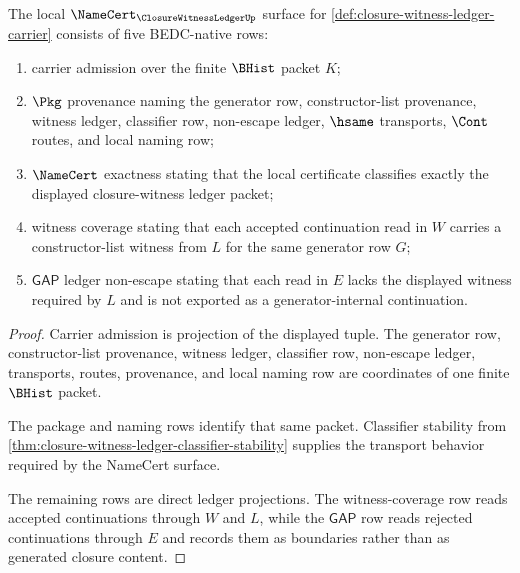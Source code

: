 \begin{theorem}
\label{thm:closure-witness-ledger-namecert-obligations}
The local $\NameCert_{\ClosureWitnessLedgerUp}$ surface for \autoref{def:closure-witness-ledger-carrier} consists of five BEDC-native rows:
\begin{enumerate}
\item carrier admission over the finite $\BHist$ packet $K$;
\item $\Pkg$ provenance naming the generator row, constructor-list provenance, witness ledger, classifier row, non-escape ledger, $\hsame$ transports, $\Cont$ routes, and local naming row;
\item $\NameCert$ exactness stating that the local certificate classifies exactly the displayed closure-witness ledger packet;
\item witness coverage stating that each accepted continuation read in $W$ carries a constructor-list witness from $L$ for the same generator row $G$;
\item $\mathsf{GAP}$ ledger non-escape stating that each read in $E$ lacks the displayed witness required by $L$ and is not exported as a generator-internal continuation.
\end{enumerate}
\end{theorem}
\begin{proof}
Carrier admission is projection of the displayed tuple. The generator row, constructor-list provenance, witness ledger, classifier row, non-escape ledger, transports, routes, provenance, and local naming row are coordinates of one finite $\BHist$ packet.

The package and naming rows identify that same packet. Classifier stability from \autoref{thm:closure-witness-ledger-classifier-stability} supplies the transport behavior required by the NameCert surface.

The remaining rows are direct ledger projections. The witness-coverage row reads accepted continuations through $W$ and $L$, while the $\mathsf{GAP}$ row reads rejected continuations through $E$ and records them as boundaries rather than as generated closure content.
\end{proof}

